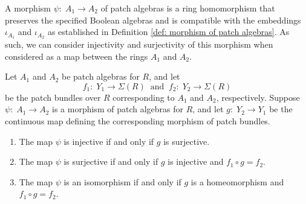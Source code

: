 \documentclass[11pt]{amsart}
\begin{document}
\medskip

A morphism  $\psi\colon\; A_1 \rightarrow A_2$ of patch algebras is a {ring homomorphism that {preserves the specified Boolean algebras and is compatible with the embeddings $\iota_{A_1}$ and $\iota_{A_2}$} as established in Definition \ref{def: morphism of patch algebras}.} As such, we can consider injectivity and surjectivity of this morphism when considered as a map between the rings $A_1$ and $A_2$.

\begin{theorem}\label{thm: inj surj iso}
Let $A_1$ and $A_2$ be patch algebras for $R$, and let $$f_1\colon\; Y_1 \to \Sigma(R) \: {\mbox{ and }} \: f_2\colon\; Y_2 \to \Sigma(R)$$  be the patch bundles over $R$ corresponding to $A_1$ and $A_2$, respectively. Suppose 
 $\psi\colon\; A_1 \rightarrow A_2$ is a morphism of patch algebras for $R$, and let $g\colon\; Y_2 \rightarrow Y_1$ be the continuous map defining the corresponding morphism of patch bundles.  
   \begin{enumerate}[label=\textup{(\arabic{*})}, mode=unboxed]
   \item\label{thm: inj} The map   $\psi$ is injective if and only if  $g$ is surjective. 
   \item\label{thm: surj} The map  $\psi$ is surjective if and only if $g$ is injective and $f_1 \circ g = f_2$.
   \item\label{thm: iso} The map $\psi$ is an isomorphism if and only if $g$ is a homeomorphism and $f_1 \circ g = f_2$.
   \end{enumerate}
\end{theorem}
\end{document}
